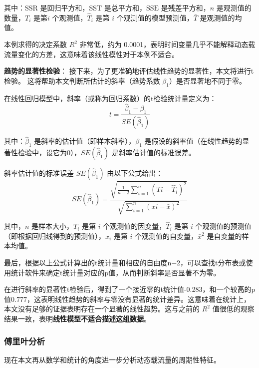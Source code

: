 \documentclass[withoutpreface,bwprint]{cumcmthesis}  %
\begin{document}
                其中：$\text{SSR}$ 是回归平方和，$\text{SST}$ 是总平方和，$\text{SSE}$ 是残差平方和，$n$ 是观测值的数量，$T_i$ 是第$i$ 个观测值，$\hat{T}_i$ 是第 $i$ 个观测值的模型预测值，$\bar{T}$ 是观测值的均值。

                本例求得的决定系数 $R^2$ 非常低，约为 0.0001，表明时间变量几乎不能解释动态载流量变化的方差，这意味着该线性模性对于本例不适合。

            \vspace{12pt}
            
            \textbf{趋势的显著性检验}：
                接下来，为了更准确地评估线性趋势的显著性，本文将进行t检验。
                这将帮助本文判断所估计的斜率（趋势系数 $\beta_1$）是否显著地不同于零。

                在线性回归模型中，斜率（或称为回归系数）的t检验统计量定义为：
                \begin{equation}
                    t=\frac{\hat{\beta}_1-\beta_1}{S E\left(\hat{\beta}_1\right)}
                \end{equation}

                其中：$\hat{\beta}_1$ 是斜率的估计值（即样本斜率），$\beta_1$ 是假设的斜率值（在线性趋势的显著性检验中，设它为0），$S E\left(\hat{\beta}_1\right)$ 是斜率估计值的标准误差。

                斜率估计值的标准误差 $S E\left(\hat{\beta}_1\right)$ 由以下公式给出：
                \begin{equation}
                    S E\left(\hat{\beta}_1\right)=\frac{\sqrt{\frac{1}{n-2} \sum_{i=1}^n\left(T i-\hat{T}_i\right)^2}}{\sqrt{\sum_{i=1}^n(x i-\bar{x})^2}}
                \end{equation}

                其中，$n$ 是样本大小，$T_i$ 是第 $i$ 个观测值的因变量，$\hat{T}_i$ 是第 $i$ 个观测值的预测值（即根据回归线得到的预测值），$x_i$ 是第 $i$ 个观测值的自变量，$\bar{x}^2$ 是自变量的样本均值。

                最后，根据以上公式计算出的t统计量和相应的自由度n−2，可以查找t分布表或使用统计软件来确定t统计量对应的p值，从而判断斜率是否显著不为零。
                
                在进行斜率的显著性t检验后，得到了一个接近零的t统计值-0.283，和一个较高的p值0.777，这表明线性趋势的斜率与零没有显著的统计差异。这意味着在统计上，本文没有足够的证据表明存在一个显著的线性趋势。这与之前的 $R^2$ 值很低的观察结果一致，表明\textbf{线性模型不适合描述这组数据}。


        \subsubsection{傅里叶分析}
        现在本文再从数学和统计的角度进一步分析动态载流量的周期性特征。
\end{document}
